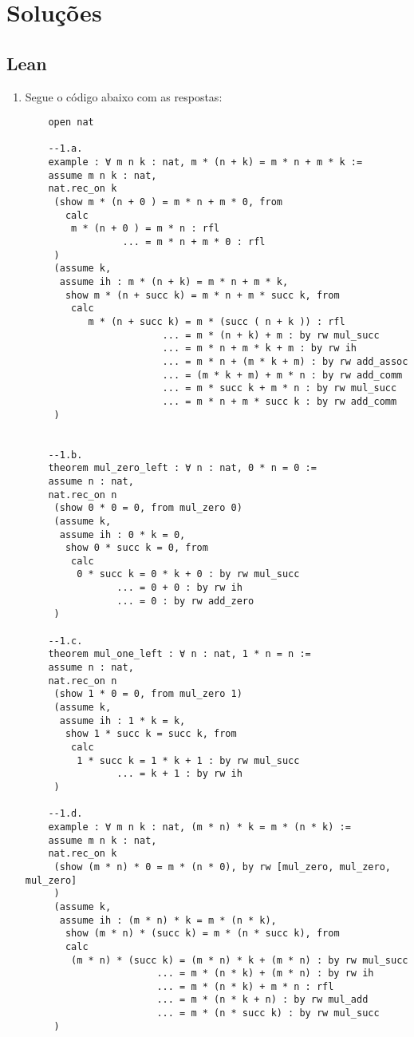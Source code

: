 \section{Soluções}
\subsection{Lean}
\begin{enumerate}
    
    \item Segue o código abaixo com as respostas:
    
    \begin{lstlisting}
    open nat
    
    --1.a.
    example : ∀ m n k : nat, m * (n + k) = m * n + m * k := 
    assume m n k : nat,
    nat.rec_on k
     (show m * (n + 0 ) = m * n + m * 0, from
       calc 
        m * (n + 0 ) = m * n : rfl 
                 ... = m * n + m * 0 : rfl
     )
     (assume k,
      assume ih : m * (n + k) = m * n + m * k,
       show m * (n + succ k) = m * n + m * succ k, from
        calc
           m * (n + succ k) = m * (succ ( n + k )) : rfl
                        ... = m * (n + k) + m : by rw mul_succ 
                        ... = m * n + m * k + m : by rw ih
                        ... = m * n + (m * k + m) : by rw add_assoc
                        ... = (m * k + m) + m * n : by rw add_comm
                        ... = m * succ k + m * n : by rw mul_succ
                        ... = m * n + m * succ k : by rw add_comm
     )
    
    
    --1.b.
    theorem mul_zero_left : ∀ n : nat, 0 * n = 0 :=
    assume n : nat,
    nat.rec_on n
     (show 0 * 0 = 0, from mul_zero 0)
     (assume k,
      assume ih : 0 * k = 0,
       show 0 * succ k = 0, from
        calc
         0 * succ k = 0 * k + 0 : by rw mul_succ
                ... = 0 + 0 : by rw ih
                ... = 0 : by rw add_zero
     )
    
    --1.c.
    theorem mul_one_left : ∀ n : nat, 1 * n = n := 
    assume n : nat,
    nat.rec_on n
     (show 1 * 0 = 0, from mul_zero 1)
     (assume k,
      assume ih : 1 * k = k,
       show 1 * succ k = succ k, from
        calc
         1 * succ k = 1 * k + 1 : by rw mul_succ
                ... = k + 1 : by rw ih
     )
    
    --1.d.
    example : ∀ m n k : nat, (m * n) * k = m * (n * k) := 
    assume m n k : nat,
    nat.rec_on k
     (show (m * n) * 0 = m * (n * 0), by rw [mul_zero, mul_zero, mul_zero]
     )
     (assume k,
      assume ih : (m * n) * k = m * (n * k),
       show (m * n) * (succ k) = m * (n * succ k), from
       calc 
        (m * n) * (succ k) = (m * n) * k + (m * n) : by rw mul_succ
                       ... = m * (n * k) + (m * n) : by rw ih
                       ... = m * (n * k) + m * n : rfl
                       ... = m * (n * k + n) : by rw mul_add
                       ... = m * (n * succ k) : by rw mul_succ
     )
    

\end{lstlisting}
\end{enumerate}
